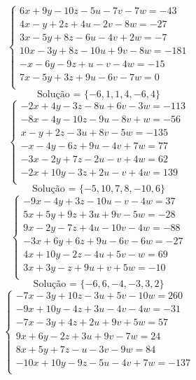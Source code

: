 \documentclass[12pt,oneside,a4paper]{article}
\begin{document}
\vspace{\baselineskip}
\begin{equation*}
\begin{cases}
6x+9y-10z-5u-7v-7w=-43 \\
4x-y+2z+4u-2v-8w=-27 \\
3x-5y+8z-6u-4v+2w=-7 \\
10x-3y+8z-10u+9v-8w=-181 \\
-x-6y-9z+u-v-4w=-15 \\
7x-5y+3z+9u-6v-7w=0 \\
\end{cases}
\end{equation*}
\begin{equation*}
\text{Solução = }\{-6,1,1,4,-6,4\}
\end{equation*}
\vspace{\baselineskip}
\begin{equation*}
\begin{cases}
-2x+4y-3z-8u+6v-3w=-113 \\
-8x-4y-10z-9u-8v+w=-56 \\
x-y+2z-3u+8v-5w=-135 \\
-x-4y-6z+9u-4v+7w=77 \\
-3x-2y+7z-2u-v+4w=62 \\
-2x+10y-3z+2u-v+4w=139 \\
\end{cases}
\end{equation*}
\begin{equation*}
\text{Solução = }\{-5,10,7,8,-10,6\}
\end{equation*}
\vspace{\baselineskip}
\begin{equation*}
\begin{cases}
-9x-4y+3z-10u-v-4w=37 \\
5x+5y+9z+3u+9v-5w=-28 \\
9x-2y-7z+4u-10v-4w=-88 \\
-3x+6y+6z+9u-6v-6w=-27 \\
4x+10y-2z-4u+5v-w=69 \\
3x+3y-z+9u+v+5w=-10 \\
\end{cases}
\end{equation*}
\begin{equation*}
\text{Solução = }\{-6,6,-4,-3,3,2\}
\end{equation*}
\vspace{\baselineskip}
\begin{equation*}
\begin{cases}
-7x-3y+10z-3u+5v-10w=260 \\
-9x+10y-4z+3u-4v-4w=-31 \\
-7x-3y+4z+2u+9v+5w=57 \\
9x+6y-2z+3u+9v-7w=24 \\
8x+5y+7z-u-3v-9w=84 \\
-10x+10y-9z-5u-4v+7w=-137 \\
\end{cases}
\end{equation*}
\end{document}
